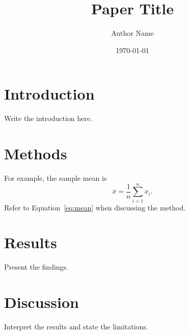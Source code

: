 \documentclass[11pt]{article}
\title{Paper Title}
\author{Author Name}
\date{\today}
\begin{document}
\maketitle

\section{Introduction}
Write the introduction here.

\section{Methods}
For example, the sample mean is
\begin{equation}
  \bar{x} = \frac{1}{n} \sum_{i=1}^{n} x_i.
  \label{eq:mean}
\end{equation}
Refer to Equation~\ref{eq:mean} when discussing the method.

\section{Results}
Present the findings.

\section{Discussion}
Interpret the results and state the limitations.
\end{document}
